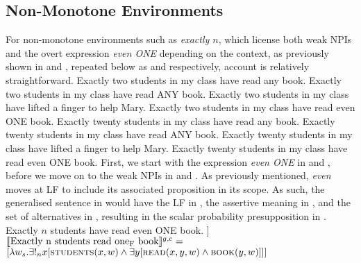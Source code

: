 \subsection{Non-Monotone Environments}
For non-monotone environments such as \textit{exactly $n$}, which license both weak NPIs and the overt expression \textit{even \MakeUppercase{one}} depending on the context, as previously shown in  and , repeated below as  and  respectively,  account is relatively straightforward.
\pex\label{ex:even-nm-okay-repeat}
\a Exactly two students in my class have read any book.
\a Exactly two students in my class have read \MakeUppercase{any} book.
\a Exactly two students in my class have lifted a finger to help Mary.
\a Exactly two students in my class have read even \MakeUppercase{one} book.
\xe
\pex\label{ex:even-nm-bad-repeat}
\a\ljudge{\#} Exactly twenty students in my class have read any book.
\a\ljudge{\#} Exactly twenty students in my class have read \MakeUppercase{any} book.
\a\ljudge{\#} Exactly twenty students in my class have lifted a finger to help Mary.
\a\ljudge{\#} Exactly twenty students in my class have read even \MakeUppercase{one} book.
\xe
First, we start with the expression \textit{even ONE} in  and , before we move on to the weak NPIs in  and . As previously mentioned, \textit{even} moves at LF to include its associated proposition in its scope. As such, the generalised sentence in  would have the LF in , the assertive meaning in , and the set of alternatives in , resulting in the scalar probability presupposition in .
\pex
\a Exactly $n$ students have read even \MakeUppercase{one} book.
\a[] [even\textsubscript{C} [exactly $n$ students read one\textsubscript{F} book]]
\a $\intension[g,c]{Exactly n students read one\textsubscript{F} book}=$\\\emptyfill$[\lambda{w_s}.\exists!_n{x}[\predicate{students}(x,w)\land\exists{y}[\predicate{read}(x,y,w)\land\predicate{book}(y,w)]]]$
